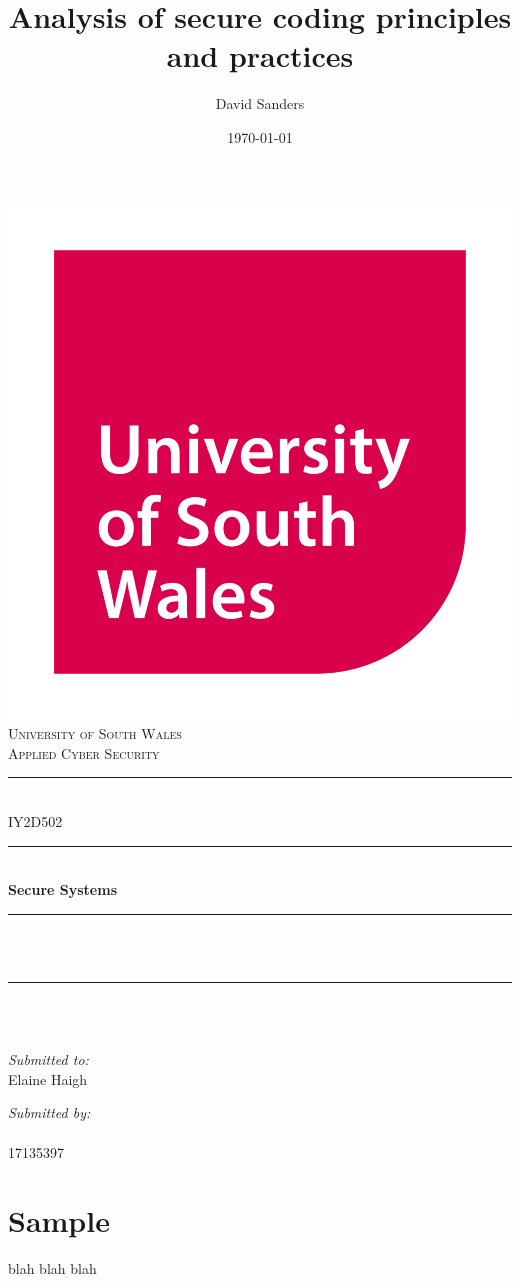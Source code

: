 \documentclass[12pt]{article}
\title{Analysis of secure coding principles and practices}
\author{David Sanders}
\date{\today}
\makeatletter
\def \unicoursename{Applied Cyber Security}
\def \unimodulecode{IY2D502}
\def \unimodulename{Secure Systems}
\def \unimodulelect{Elaine Haigh}
\def \unistudentid{17135397}
\let\thetitle\@title
\let\theauthor\@author
\let\thedate\@date
\makeatother
\begin{document}
\begin{titlepage}
  \centering
  \includegraphics[scale = 0.15]{usw_logo.jpg}\\
  \textsc{\LARGE University of South Wales\\\Large \unicoursename}\\[2cm]

  \rule{\linewidth}{0.2 mm}\\[0.5cm]
  {\huge \unimodulecode}\\
  \rule{\linewidth}{0.2 mm}\\[0.5cm]
  {\huge\bfseries \unimodulename}\\
  \rule{\linewidth}{0.2 mm}\\[0.5cm]
  \textsc{\Large \thetitle}\\
  \rule{\linewidth}{0.2 mm}\\[2cm]

  {\large \textit{\thedate}}\\[2cm]

  \begin{minipage}[t]{0.4\textwidth}
    \begin{flushleft} \large
      \textit{Submitted to:}\\
      \unimodulelect
    \end{flushleft}
  \end{minipage}
  \begin{minipage}[t]{0.4\textwidth}
    \begin{flushright} \large
      \textit{Submitted by:}\\
      \theauthor\\\unistudentid
    \end{flushright}
  \end{minipage}
\end{titlepage}



\tableofcontents
\pagebreak



\section{Sample}
blah blah blah
\end{document}
